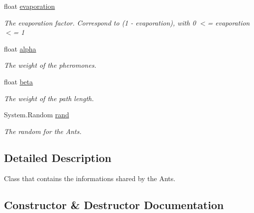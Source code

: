 \begin{DoxyCompactItemize}
float \hyperlink{classCommonKnowledge_ac477ae6e96dd6685bc1c4e977d3ad2b5}{evaporation}
\begin{DoxyCompactList}\small\item\em The evaporation factor. Correspond to (1 -\/ evaporation), with 0 $<$= evaporation $<$= 1\end{DoxyCompactList}\item 
float \hyperlink{classCommonKnowledge_a3a7589d86c441388b36cd87a92857a53}{alpha}
\begin{DoxyCompactList}\small\item\em The weight of the pheromones.\end{DoxyCompactList}\item 
float \hyperlink{classCommonKnowledge_a08c6533f6981349a857792f8baecfc32}{beta}
\begin{DoxyCompactList}\small\item\em The weight of the path length.\end{DoxyCompactList}\item 
System.\+Random \hyperlink{classCommonKnowledge_aadb41354867c487a995404dc63cb3bd3}{rand}
\begin{DoxyCompactList}\small\item\em The random for the Ants.\end{DoxyCompactList}\end{DoxyCompactItemize}


\subsection{Detailed Description}
Class that contains the informations shared by the Ants. 



\subsection{Constructor \& Destructor Documentation}
\mbox{\label{classCommonKnowledge_a19b7dc1389bd6e507e8b7517f2b4ac44}} 
